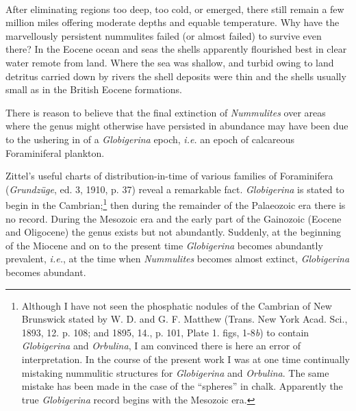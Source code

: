 \documentclass[a4paper, 12pt, oneside]{article}
\begin{document}
\paragraph{}
After eliminating regions too deep, too cold, or emerged, there still remain a few million miles offering moderate depths and equable temperature. Why have the marvellously persistent nummulites failed (or almost failed) to survive even there? In the Eocene ocean and seas the shells apparently flourished best in clear water remote from land. Where the sea was shallow, and turbid owing to land detritus carried down by rivers the shell deposits were thin and the shells usually small as in the British Eocene formations.

There is reason to believe that the final extinction of \emph{Nummulites} over areas where the genus might otherwise have persisted in abundance may have been due to the ushering in of a \emph{Globigerina} epoch, \emph{i.e.} an epoch of calcareous Foraminiferal plankton.

Zittel's useful charts of distribution-in-time of various families of Foraminifera (\emph{Grundzüge}, ed. 3, 1910, p. 37) reveal a remarkable fact. \emph{Globigerina} is stated to begin in the Cambrian;\footnote{Although I have not seen the phosphatic nodules of the Cambrian of New Brunswick stated by W. D. and G. F. Matthew (Trans. New York Acad. Sci., 1893, 12. p. 108; and 1895, 14., p. 101, Plate 1. figs, 1-8\emph{b}) to contain \emph{Globigerina} and \emph{Orbulina}, I am convinced there is here an error of interpretation. In the course of the present work I was at one time continually mistaking nummulitic structures for \emph{Globigerina} and \emph{Orbulina}. The same mistake has been made in the case of the ``spheres'' in chalk. Apparently the true \emph{Globigerina} record begins with the Mesozoic era.} then during the remainder of the Palaeozoic era there is no record. During the Mesozoic era and the early part of the Gainozoic (Eocene and Oligocene) the genus exists but not abundantly. Suddenly, at the beginning of the Miocene and on to the present time \emph{Globigerina} becomes abundantly prevalent, \emph{i.e.}, at the time when \emph{Nummulites} becomes almost extinct, \emph{Globigerina} becomes abundant.
\end{document}
